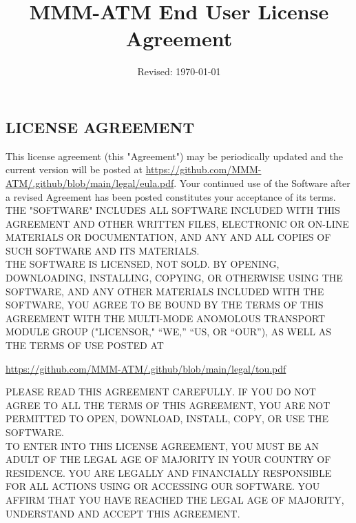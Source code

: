 \documentclass[11pt]{article}
\title{MMM-ATM End User License Agreement\vspace{-\baselineskip}}
\date{Revised: \today}
\begin{document}
\maketitle

\subsection*{LICENSE AGREEMENT}

This license agreement (this "Agreement") may be periodically updated and the current version will be posted at \href{https://github.com/MMM-ATM/.github/blob/main/legal/eula.pdf}{https://github.com/MMM-ATM/.github/blob/main/legal/eula.pdf}. Your continued use of the Software after a revised Agreement has been posted constitutes your acceptance of its terms.\\[\baselineskip]
THE "SOFTWARE" INCLUDES ALL SOFTWARE INCLUDED WITH THIS AGREEMENT AND OTHER WRITTEN FILES, ELECTRONIC OR ON-LINE MATERIALS OR DOCUMENTATION, AND ANY AND ALL COPIES OF SUCH SOFTWARE AND ITS MATERIALS.\\[\baselineskip]
THE SOFTWARE IS LICENSED, NOT SOLD. BY OPENING, DOWNLOADING, INSTALLING, COPYING, OR OTHERWISE USING THE SOFTWARE, AND ANY OTHER MATERIALS INCLUDED WITH THE SOFTWARE, YOU AGREE TO BE BOUND BY THE TERMS OF THIS AGREEMENT WITH THE MULTI-MODE ANOMOLOUS TRANSPORT MODULE GROUP ("LICENSOR," “WE,” “US, OR “OUR”), AS WELL AS THE TERMS OF USE POSTED AT
\begin{center}
\href{https://github.com/MMM-ATM/.github/blob/main/legal/tou.pdf}{https://github.com/MMM-ATM/.github/blob/main/legal/tou.pdf}\\[\baselineskip]
\end{center}
PLEASE READ THIS AGREEMENT CAREFULLY. IF YOU DO NOT AGREE TO ALL THE TERMS OF THIS AGREEMENT, YOU ARE NOT PERMITTED TO OPEN, DOWNLOAD, INSTALL, COPY, OR USE THE SOFTWARE.\\[\baselineskip]
TO ENTER INTO THIS LICENSE AGREEMENT, YOU MUST BE AN ADULT OF THE LEGAL AGE OF MAJORITY IN YOUR COUNTRY OF RESIDENCE. YOU ARE LEGALLY AND FINANCIALLY RESPONSIBLE FOR ALL ACTIONS USING OR ACCESSING OUR SOFTWARE. YOU AFFIRM THAT YOU HAVE REACHED THE LEGAL AGE OF MAJORITY, UNDERSTAND AND ACCEPT THIS AGREEMENT.
\end{document}
